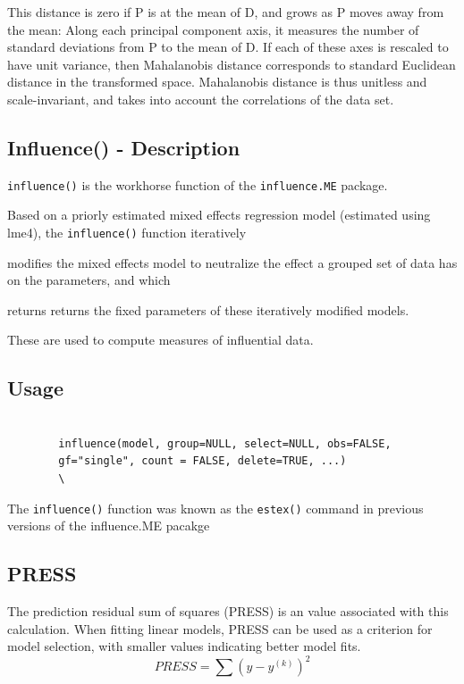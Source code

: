 	This distance is zero if P is at the mean of D, and grows as P moves away from the mean: Along each principal component axis, it measures the 
	number of standard deviations from P to the mean of D. If each of these axes is rescaled to have unit variance, then Mahalanobis distance corresponds to standard Euclidean distance in the transformed space. Mahalanobis distance is thus unitless and scale-invariant, and takes into account the correlations of the data set.

	\subsection*{Influence() - Description}
	\texttt{influence()} is the workhorse function of the \texttt{influence.ME} package. 
	
	
	Based on a priorly estimated mixed effects regression model (estimated using lme4), the \texttt{influence()} function iteratively 
	
	modifies the mixed effects model to neutralize the effect a grouped set of data has on the parameters, and which 
	
	returns returns the fixed parameters of these iteratively modified models. 
	
	These are used to compute measures of influential data.
	
	
	
	
	\subsection*{Usage}
	\begin{framed}
		\begin{verbatim}
		
		influence(model, group=NULL, select=NULL, obs=FALSE, 
		gf="single", count = FALSE, delete=TRUE, ...)
		\
		\end{verbatim}
	\end{framed}
	
	
	The \texttt{influence()} function was known as the \texttt{estex()} command in previous versions of the influence.ME pacakge

	
	
	
	
	


	\subsection{PRESS} %
	The prediction residual sum of squares (PRESS) is an value associated with this calculation. When fitting linear models, PRESS can be used as a criterion for model selection, with smaller values indicating better model fits.
	\begin{equation}
	PRESS = \sum(y-y^{(k)})^2
	\end{equation}
	
